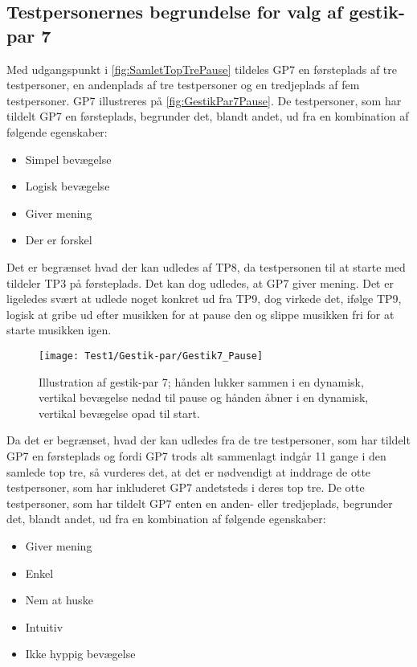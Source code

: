 \subsection{Testpersonernes begrundelse for valg af gestik-par 7}
\label{TestresultaterValgAfGestikkerBegrundelseGP7Pause}
%
Med udgangspunkt i \autoref{fig:SamletTopTrePause} tildeles GP7 en førsteplads af tre testpersoner, en andenplads af tre testpersoner og en tredjeplads af fem testpersoner. GP7 illustreres på \autoref{fig:GestikPar7Pause}. De testpersoner, som har tildelt GP7 en førsteplads, begrunder det, blandt andet, ud fra en kombination af følgende egenskaber: 
%
\begin{multicols}{3}
    \begin{itemize}
        \item Simpel bevægelse
        \item Logisk bevægelse
        \item Giver mening
        \item Der er forskel 
\end{itemize}
\end{multicols}
\noindent
%
Det er begrænset hvad der kan udledes af TP8, da testpersonen til at starte med tildeler TP3 på førsteplads. Det kan dog udledes, at GP7 giver mening. Det er ligeledes svært at udlede noget konkret ud fra TP9, dog virkede det, ifølge TP9, logisk at gribe ud efter musikken for at pause den og slippe musikken fri for at starte musikken igen.
%
\begin{figure}[H]
	\centering
	\texttt{[image: Test1/Gestik-par/Gestik7\_Pause]}
	\caption{Illustration af gestik-par 7; hånden lukker sammen i en dynamisk, vertikal bevægelse nedad til pause og hånden åbner i en dynamisk, vertikal bevægelse opad til start.}
	\label{fig:GestikPar7Pause}
\end{figure}
\noindent
%
Da det er begrænset, hvad der kan udledes fra de tre testpersoner, som har tildelt GP7 en førsteplads og fordi GP7 trods alt sammenlagt indgår 11 gange i den samlede top tre, så vurderes det, at det er nødvendigt at inddrage de otte testpersoner, som har inkluderet GP7 andetsteds i deres top tre. De otte testpersoner, som har tildelt GP7 enten en anden- eller tredjeplads, begrunder det, blandt andet, ud fra en kombination af følgende egenskaber: 
%
\begin{multicols}{3}
    \begin{itemize}
        \item Giver mening
        \item Enkel
        \item Nem at huske
        \item Intuitiv
        \item Ikke hyppig bevægelse
\end{itemize}
\end{multicols}
